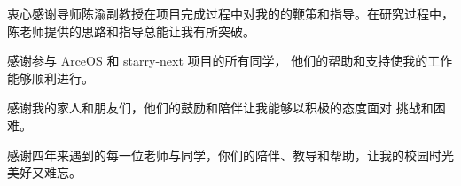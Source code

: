 
\begin{acknowledgements}
衷心感谢导师陈渝副教授在项目完成过程中对我的的鞭策和指导。在研究过程中，
陈老师提供的思路和指导总能让我有所突破。

感谢参与 ArceOS 和 starry-next 项目的所有同学，
他们的帮助和支持使我的工作能够顺利进行。

感谢我的家人和朋友们，他们的鼓励和陪伴让我能够以积极的态度面对
挑战和困难。

感谢四年来遇到的每一位老师与同学，你们的陪伴、教导和帮助，让我的校园时光美好又难忘。
\end{acknowledgements}